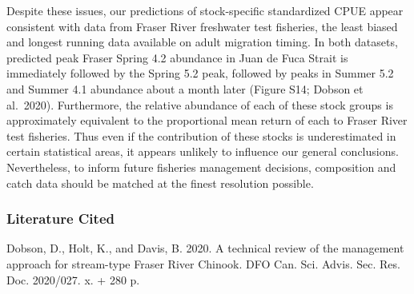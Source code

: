 \documentclass[
]{article}
\begin{document}
Despite these issues, our predictions of stock-specific standardized
CPUE appear consistent with data from Fraser River freshwater test
fisheries, the least biased and longest running data available on adult
migration timing. In both datasets, predicted peak Fraser Spring 4.2
abundance in Juan de Fuca Strait is immediately followed by the Spring
5.2 peak, followed by peaks in Summer 5.2 and Summer 4.1 abundance about
a month later (Figure S14; Dobson et al.~2020). Furthermore, the
relative abundance of each of these stock groups is approximately
equivalent to the proportional mean return of each to Fraser River test
fisheries. Thus even if the contribution of these stocks is
underestimated in certain statistical areas, it appears unlikely to
influence our general conclusions. Nevertheless, to inform future
fisheries management decisions, composition and catch data should be
matched at the finest resolution possible.

\hypertarget{literature-cited}{%
\subsubsection{Literature Cited}\label{literature-cited}}

Dobson, D., Holt, K., and Davis, B. 2020. A technical review of the
management approach for stream-type Fraser River Chinook. DFO Can. Sci.
Advis. Sec. Res. Doc. 2020/027. x. + 280 p.
\end{document}
